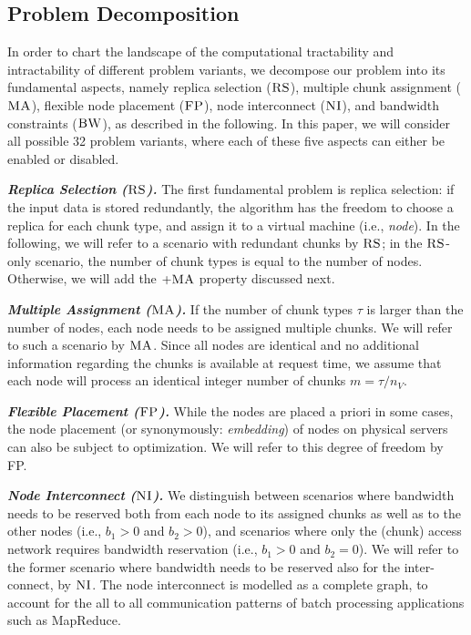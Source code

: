 \documentclass[preprint,12pt]{elsarticle}
\newcommand{\MaFactor}{m}
\newcommand{\capa}{\emph{cap}}
\newcommand{\CC}{\textsc{NI}}
\newcommand{\FP}{\textsc{FP}}
\newcommand{\RS}{\textsc{RS}}
\newcommand{\BW}{\textsc{BW}}
\newcommand{\MA}{\textsc{MA}}
\newcommand{\CostTrans}{\ensuremath{b_1}}
\newcommand{\CostCom}{\ensuremath{b_2}}
\begin{document}

\subsection{Problem Decomposition}

In order to chart the landscape of the computational tractability and intractability of different
problem variants, we decompose our problem into its fundamental aspects, namely replica selection
($\RS$), multiple chunk assignment ($\MA$), flexible node placement ($\FP$), node interconnect ($\CC$),
and bandwidth constraints ($\BW$), as described in the following. 
In this paper, we will consider all possible 32 problem variants, where each of these five aspects
can either be enabled or disabled. 

\textbf{\emph{Replica Selection ($\RS$).}} The first fundamental problem is replica selection:
if the input data is stored redundantly, the algorithm has the freedom to choose a replica
for each chunk type, and assign it to a virtual machine (i.e., \emph{node}).
In the following, we will refer to a scenario
with redundant chunks by $\RS$; in the $\RS$-only scenario, the number of chunk types
is equal to the number of nodes. Otherwise, we will add the $+\MA$ property discussed next.

\textbf{\emph{Multiple Assignment ($\MA$).}}
If the number of chunk types $\tau$ is larger than the number of nodes,
each node needs to be assigned multiple chunks. We will refer to such a scenario by $\MA$. 
Since all nodes are identical and no additional information regarding the chunks is available at request time, we assume that each node will process an identical integer number of chunks $\MaFactor = \tau / n_V$. 


\textbf{\emph{Flexible Placement ($\FP$).}} %
While the nodes are placed a priori in some cases, the node placement (or
synonymously: \emph{embedding}) of nodes on physical servers can also be
subject to optimization. We will refer to this degree of freedom by FP.

\textbf{\emph{Node Interconnect ($\CC$).}} We distinguish between scenarios
where bandwidth needs to be reserved
both from each node to its assigned chunks as well as to the other nodes
(i.e., $\CostTrans>0$ and $\CostCom>0$), and
 scenarios where only the (chunk) access network requires bandwidth reservation (i.e., $\CostTrans>0$ and $\CostCom=0$).
 We will refer to the former scenario
where bandwidth needs to be reserved also for the inter-connect, by $\CC$. 
The node interconnect is modelled as a complete graph, to account for the all to all communication patterns of batch processing applications such as MapReduce.
\end{document}
